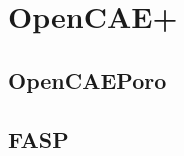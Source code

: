 \documentclass[letterpaper,10pt,english]{sphinxmanual}
\begin{document}
\chapter{OpenCAE+}
\label{\detokenize{index:opencae}}

\section{OpenCAEPoro}
\label{\detokenize{index:opencaeporo}}

\section{FASP}
\label{\detokenize{index:fasp}}


\renewcommand{\indexname}{Index}
\printindex
\end{document}
